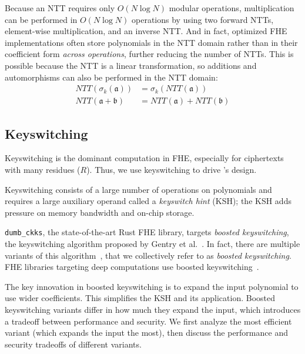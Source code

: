 Because an NTT requires only $O(N \log N)$ modular operations, 
multiplication can be performed in $O(N \log N)$ operations by using two forward NTTs,
element-wise multiplication, and an inverse NTT.
And in fact, optimized FHE implementations often store polynomials in the NTT domain
rather than in their coefficient form \emph{across operations}, further reducing the number of NTTs.
This is possible because the NTT is a linear transformation, so additions and automorphisms can also be performed in the NTT domain:
\vspace{-0.05in} %
\begin{align*}
    NTT(\sigma_k(\mathfrak{a})) &= \sigma_k(NTT(\mathfrak{a})) \\
    NTT(\mathfrak{a} + \mathfrak{b}) &= NTT(\mathfrak{a}) + NTT(\mathfrak{b})
\end{align*}
\vspace{-0.2in}

\subsection{Keyswitching}\label{sec:keyswitching}

Keyswitching is the dominant computation in FHE, especially for ciphertexts 
with many residues ($R$).
Thus, we use keyswitching to drive \name's design.



Keyswitching consists of a large number of operations on polynomials and 
requires a large auxiliary operand called a  \emph{keyswitch hint} (KSH);
the KSH adds pressure on memory bandwidth and on-chip storage.


\verb!dumb_ckks!, the state-of-the-art Rust FHE library, targets \emph{boosted
keyswitching}, the keyswitching algorithm
proposed by Gentry et al.~\cite[Section 3.1]{gentry:crypto2012:homomorphic}.
In fact, there are multiple variants of this algorithm~\cite[Section 5.3.4]{halevi2020helib},
that we collectively refer to as \emph{boosted keyswitching}.
FHE libraries targeting deep computations use boosted
keyswitching~\cite{gentry:crypto2012:homomorphic,halevi2020helib,heaan,mouchet2020lattigo}.

The key innovation in boosted keyswitching is to expand the input polynomial to use wider coefficients.
This simplifies the KSH and its application.
Boosted keyswitching variants differ in how much they expand the input,
which introduces a tradeoff between performance and security.
We first analyze the most efficient variant (which expands the input the most),
then discuss the performance and security tradeoffs of different variants.


